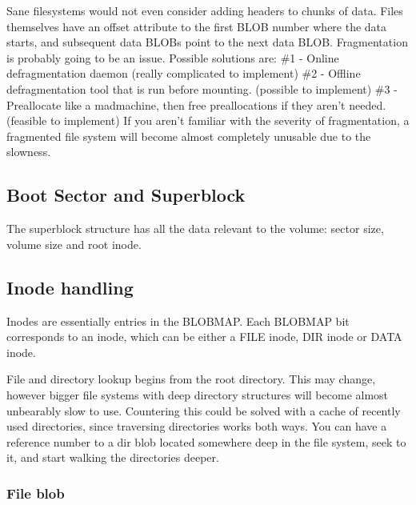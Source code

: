 \documentclass{article}
\begin{document}
Sane filesystems would not even consider adding headers to chunks of data.
Files themselves have an offset attribute to the first BLOB number where the data starts, and subsequent data BLOBs point to the next data BLOB.
\newline
Fragmentation is probably going to be an issue.
Possible solutions are:
\newline
\#1 - Online defragmentation daemon (really complicated to implement)
\newline
\#2 - Offline defragmentation tool that is run before mounting. (possible to implement)
\newline
\#3 - Preallocate like a madmachine, then free preallocations if they aren't needed. (feasible to implement)
\newline
If you aren't familiar with the severity of fragmentation, a fragmented file system will become almost completely unusable due to the slowness.

\subsection{Boot Sector and Superblock}
The superblock structure has all the data relevant to the volume: sector size, volume size and root inode.

\subsection{Inode handling}
Inodes are essentially entries in the BLOBMAP.
Each BLOBMAP bit corresponds to an inode, which can be either a FILE inode, DIR inode or DATA inode.

File and directory lookup begins from the root directory.
This may change, however bigger file systems with deep directory structures will become almost unbearably slow to use.
Countering this could be solved with a cache of recently used directories, since traversing directories works both ways.
You can have a reference number to a dir blob located somewhere deep in the file system, seek to it, and start walking the directories deeper.
\subsubsection{File blob}
\vspace{0.3cm}
\end{document}
